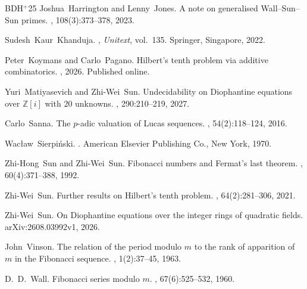 \documentclass[12pt]{amsart}
\numberwithin{equation}{section}
\theoremstyle{remark}
\theoremstyle{plain}
\newcommand{\Z}{\mathbb{Z}}
\begin{document}
\begin{thebibliography}{BDH$^+$25}
Joshua~Harrington and Lenny~Jones.
\newblock A note on generalised Wall--Sun--Sun primes.
, 108(3):373--378, 2023.

Sudesh~Kaur~Khanduja.
, {\em Unitext}, vol.~135.
\newblock Springer, Singapore, 2022.

Peter~Koymans and Carlo~Pagano.
\newblock Hilbert's tenth problem via additive combinatorics.
, 2026. Published online.

Yuri~Matiyasevich and Zhi-Wei~Sun.
\newblock Undecidability on Diophantine equations over $\Z[i]$ with $20$ unknowns.
, 290:210--219, 2027.

Carlo~Sanna.
\newblock The $p$-adic valuation of Lucas sequences.
, 54(2):118--124, 2016.

Wac{\l}aw~Sierpi\'nski.
.
\newblock American Elsevier Publishing Co., New York, 1970.

Zhi-Hong~Sun and Zhi-Wei~Sun.
\newblock Fibonacci numbers and Fermat's last theorem.
, 60(4):371--388, 1992.

Zhi-Wei~Sun.
\newblock Further results on Hilbert's tenth problem.
, 64(2):281--306, 2021.

Zhi-Wei~Sun.
\newblock On Diophantine equations over the integer rings of quadratic fields.
\newblock arXiv:2608.03992v1, 2026.

John~Vinson.
\newblock The relation of the period modulo $m$ to the rank of apparition of $m$ in the Fibonacci sequence.
, 1(2):37--45, 1963.

D.~D.~Wall.
\newblock Fibonacci series modulo $m$.
, 67(6):525--532, 1960.

\end{thebibliography}
\end{document}
